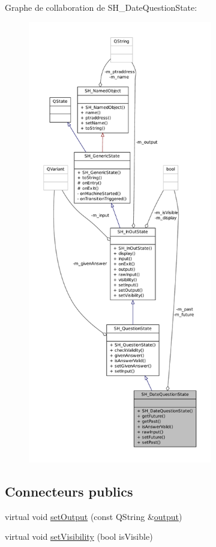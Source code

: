 Graphe de collaboration de S\-H\-\_\-\-Date\-Question\-State\-:\nopagebreak
\begin{figure}[H]
\begin{center}
\leavevmode
\includegraphics[height=550pt]{classSH__DateQuestionState__coll__graph}
\end{center}
\end{figure}
\subsection*{Connecteurs publics}
\begin{DoxyCompactItemize}
\item 
virtual void \hyperlink{classSH__InOutState_a7dc244d72e09fdbc30eb3a704b05a4d8}{set\-Output} (const Q\-String \&\hyperlink{classSH__InOutState_a1a2fd4f34484125058e20730aaee7e46}{output})
\item 
virtual void \hyperlink{classSH__InOutState_a7706a2ea1367ab3416db27fa0f4794f7}{set\-Visibility} (bool is\-Visible)
\end{DoxyCompactItemize}

